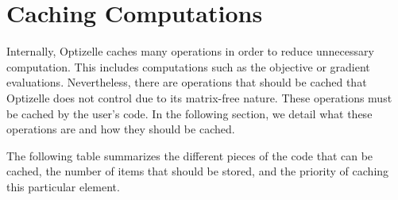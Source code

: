 \documentclass{report}
\newcommand{\seccaching}{Caching Computations}
\begin{document}
\section{\seccaching}\label{sec:caching}

    Internally, Optizelle caches many operations in order to reduce unnecessary computation.  This includes computations such as the objective or gradient evaluations.  Nevertheless, there are operations that should be cached that Optizelle does not control due to its matrix-free nature.  These operations must be cached by the user's code.  In the following section, we detail what these operations are and how they should be cached.

    The following table summarizes the different pieces of the code that can be cached, the number of items that should be stored, and the priority of caching this particular element.
\end{document}
